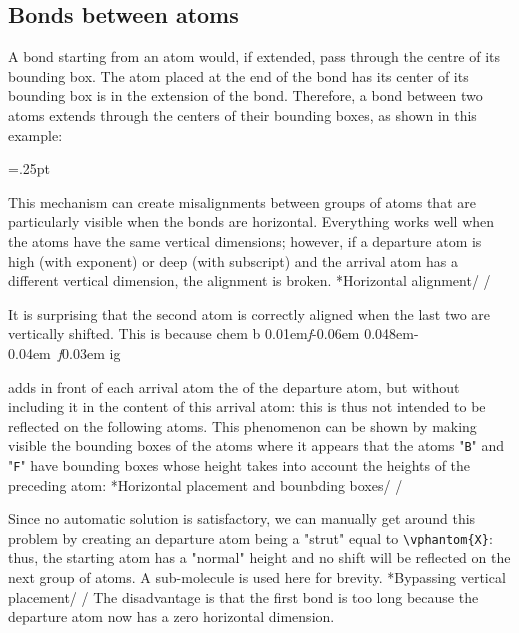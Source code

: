 \documentclass[10pt]{article}
\makeatletter
\newcommand\make@car@active[1]{%
	\catcode`#1\active
	\begingroup
		\lccode`\~`#1\relax
		\lowercase{\endgroup\def~}%
}
\newif\if@exstar
\newcommand\exemple{%
	\begingroup
	\parskip\z@
	\@makeother\;\@makeother\!\@makeother\?\@makeother\:%
	\@ifstar{\@exstartrue\exemple@}{\@exstarfalse\exemple@}}
\newcommand\exemple@[2][65]{%
	\medbreak\noindent
	\begingroup
		\let\do\@makeother\dospecials
		\make@car@active\ { {}}%
		\make@car@active\^^M{\par\leavevmode}%
		\make@car@active\^^I{\space\space}%
		\make@car@active\,{\leavevmode\kern\z@\string,}%
		\make@car@active\-{\leavevmode\kern\z@\string-}%
		\make@car@active\>{\leavevmode\kern\z@\string>}%
		\make@car@active\<{\leavevmode\kern\z@\string<}%
		\exemple@@{#1}{#2}%
}
\newcommand\exemple@@[3]{%
	\def\@tempa##1#3{\exemple@@@{#1}{#2}{##1}}%
	\@tempa
}
\newcommand\exemple@@@[3]{%
	\xdef\the@code{#3}%
	\endgroup
	\if@exstar
		\begingroup
			\fboxrule0.4pt
			\let\breakboxparindent\z@
			\def\bkvz@bottom{\hrule\@height\fboxrule}%
			\let\bkvz@before@breakbox\relax
			\def\bkvz@set@linewidth{\advance\linewidth\dimexpr-2\fboxrule-2\fboxsep}%
			\def\bkvz@left{\vrule\@width\fboxrule\hskip\fboxsep}%
			\def\bkvz@right{\hskip\fboxsep\vrule\@width\fboxrule}%
			\def\bkvz@top{\hbox to \hsize{%
				\vrule\@width\fboxrule\@height\fboxrule
				\leaders\bkvz@bottom\hfill
				\sffamily
				\fboxsep\z@
				\colorbox{black}{\kern0.25em\color{white}\footnotesize\lower0.5ex\hbox{\strut#2}\kern0.25em}%
				\leaders\bkvz@bottom\hfill
				\vrule\@width\fboxrule\@height\fboxrule}}%
			\breakbox
				\kern.5ex\relax
				\ttfamily\footnotesize\the@code\par
				\normalfont
				\kern3pt
				\hrule height0.1pt width\linewidth depth0.1pt
				\vskip5pt
				\rightskip0pt plus 1fill
				\everypar{{\color{lightgray}\rlap{\vrule height0.1pt width\linewidth depth0.1pt}}\hskip0pt plus 1fill}%
				\newlinechar`\^^M\everyeof{\noexpand}\scantokens{#3}\par
			\endbreakbox
		\endgroup
	\else
		\vskip0.5ex
		\boxput*(0,1)
			{\fboxsep\z@
			\hbox{\sffamily\colorbox{black}{\leavevmode\kern0.25em{\color{white}\footnotesize\strut#2}\kern0.25em}}%
			}%
			{\fboxsep5pt
			\fbox{%
				$\vcenter{\hsize\dimexpr0.#1\linewidth-\fboxsep-\fboxrule\relax
					\kern5pt\parskip0pt \ttfamily\footnotesize\the@code}%
				\vcenter{\kern5pt\hsize\dimexpr\linewidth-0.#1\linewidth-\fboxsep-\fboxrule\relax
					\everypar{{\color{lightgray}\rlap{\vrule height0.1pt width\dimexpr\linewidth-0.#1\linewidth-\fboxsep-\fboxrule depth0.1pt}}}%
					\footnotesize\newlinechar`\^^M\everyeof{\noexpand}\scantokens{#3}}$%
				}%
			}%
	\fi
	\medbreak
	\endgroup
}
\newcommand\falseverb[1]{{\ttfamily\detokenize\expandafter{\string#1}}}
\DeclareRobustCommand\CF{%
	\textsf{%
		chem%
		\if\string b\detokenize\expandafter{\f@series}%
			\lower0.01em\hbox{\itshape f}\kern-0.06em
		\else
			\lower0.048em\hbox{\kern-0.04em \itshape f}\kern0.03em
		\fi ig%
		}%
		\xspace
}
\makeatother
\begin{document}
\subsection{Bonds between atoms}\label{liaisonentreatomes}
A bond starting from an atom would, if extended, pass through the centre of its bounding box. The atom placed at the end of the bond has its center of its bounding box is in the extension of the bond. Therefore, a bond between two atoms extends through the centers of their bounding boxes, as shown in this example:
\begin{center}
\fboxsep=.25pt
\renewcommand\printatom[1]{\fbox{\ensuremath{\mathrm{#1}}}}
\Large
{}
\end{center}
This mechanism can create misalignments between groups of atoms that are particularly visible when the bonds are horizontal. Everything works well when the atoms have the same vertical dimensions; however, if a departure atom is high (with exponent) or deep (with subscript) and the arrival atom has a different vertical dimension, the alignment is broken.
\exemple*{Horizontal alignment}/\Huge{}
\qquad
{}/

It is surprising that the second atom is correctly aligned when the last two are vertically shifted. This is because \CF adds in front of each arrival atom the \falseverb{\vphantom} of the departure atom, but without including it in the content of this arrival atom: this \falseverb{\vphantom} is thus not intended to be reflected on the following atoms. This phenomenon can be shown by making visible the bounding boxes of the atoms where it appears that the atoms "\verb-B-" and "\verb-F-" have bounding boxes whose height takes into account the heights of the preceding atom:
\exemple*{Horizontal placement and bounbding boxes}/\Huge{}
\fboxsep=0pt
\renewcommand\printatom[1]{\fbox{\ensuremath{\mathrm#1}}}
\qquad
{}/

Since no automatic solution is satisfactory, we can manually get around this problem by creating an departure atom being a "strut" equal to \verb|\vphantom{X}|: thus, the starting atom has a "normal" height and no shift will be reflected on the next group of atoms. A sub-molecule is used here for brevity.
\exemple*{Bypassing vertical placement}/\Huge{}
\I{\vphantom{X}}
\qquad
{}/
The disadvantage is that the first bond is too long because the departure atom now has a zero horizontal dimension.
\end{document}
